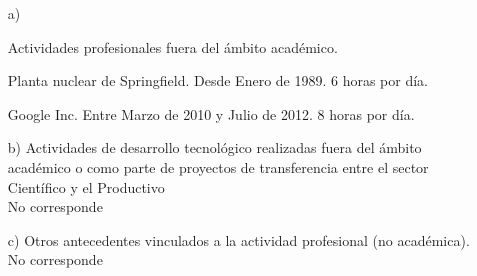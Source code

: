 \begin{enumerate}[leftmargin=0.8cm]

  \item[a)]{Actividades profesionales fuera del ámbito académico.

    \begin{itemize}[leftmargin=0.2cm]

      {Planta nuclear de Springfield.}
      {Desde Enero de 1989. 6 horas por día.}
      {}

      {Google Inc.}
      {Entre Marzo de 2010 y Julio de 2012. 8 horas por día.}
      {}

    \end{itemize}

  }

  \item[b)]{Actividades de desarrollo tecnológico realizadas fuera del ámbito académico o como parte de proyectos de
transferencia entre el sector Científico y el Productivo
    \\ No corresponde
  }

  \item[c)]{Otros antecedentes vinculados a la actividad profesional (no académica).
    \\ No corresponde
  }

\end{enumerate}
